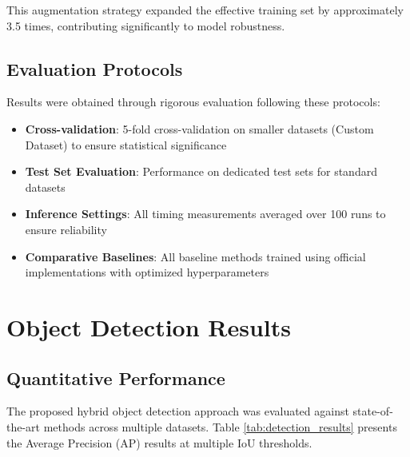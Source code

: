 This augmentation strategy expanded the effective training set by approximately 3.5 times, contributing significantly to model robustness.

\subsection{Evaluation Protocols}
Results were obtained through rigorous evaluation following these protocols:

\begin{itemize}
    \item \textbf{Cross-validation}: 5-fold cross-validation on smaller datasets (Custom Dataset) to ensure statistical significance
    
    \item \textbf{Test Set Evaluation}: Performance on dedicated test sets for standard datasets
    
    \item \textbf{Inference Settings}: All timing measurements averaged over 100 runs to ensure reliability
    
    \item \textbf{Comparative Baselines}: All baseline methods trained using official implementations with optimized hyperparameters
\end{itemize}

\section{Object Detection Results}

\subsection{Quantitative Performance}
The proposed hybrid object detection approach was evaluated against state-of-the-art methods across multiple datasets. Table \ref{tab:detection_results} presents the Average Precision (AP) results at multiple IoU thresholds.

